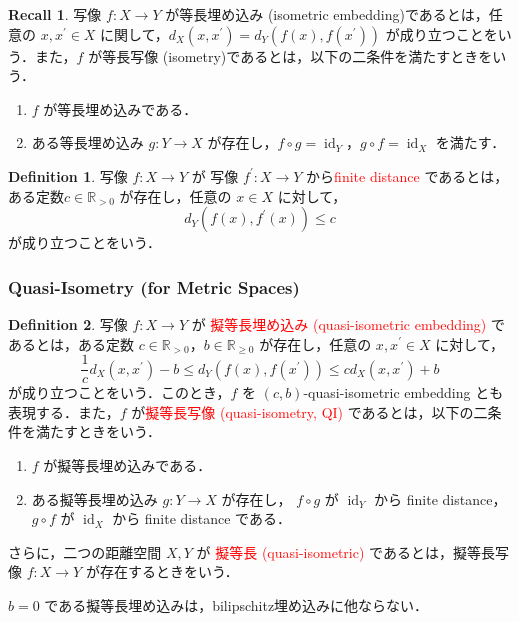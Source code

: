\documentclass[10pt]{beamer}
\DeclareMathOperator{\id}{id}
\theoremstyle{definition}
\newtheorem{dfn}{Definition}[section]
\newtheorem*{rec}{Recall}
\begin{document}
\begin{frame}
    \vspace{5mm}
    \begin{rec}
        写像 $f\colon X\rightarrow Y$ が等長埋め込み (isometric embedding)であるとは，任意の $x,x^\prime\in X$ に関して，$d_X(x,x^\prime)=d_Y(f(x),f(x^\prime))$ が成り立つことをいう．また，$f$ が等長写像 (isometry)であるとは，以下の二条件を満たすときをいう．
        \begin{enumerate}
        \item $f$ が等長埋め込みである．
        \item ある等長埋め込み $g\colon Y\rightarrow X$ が存在し，$f\circ g=\id_Y，g\circ f=\id_X$ を満たす．
        \end{enumerate}
    \end{rec}
    \begin{dfn}
        写像 $f\colon X\rightarrow Y$ が 写像 $f^\prime\colon X\rightarrow Y$ から\textcolor{red}{finite distance} であるとは，ある定数$c\in\mathbb{R}_{>0}$ が存在し，任意の $x\in X$ に対して，
        $$d_Y(f(x),f^\prime(x))\leq c$$
が成り立つことをいう．
    \end{dfn}
\end{frame}

\begin{frame}
    \frametitle{Quasi-Isometry (for Metric Spaces)}
    \begin{dfn}
        写像 $f\colon X\rightarrow Y$ が \textcolor{red}{擬等長埋め込み (quasi-isometric embedding)} であるとは，ある定数 $c\in\mathbb{R}_{>0}$，$b\in\mathbb{R}_{\geq0}$ が存在し，任意の $x,x^\prime\in X$ に対して，
        $$\frac{1}{c}d_X(x,x^\prime)-b\leq d_Y(f(x),f(x^\prime))\leq cd_X(x,x^\prime)+b$$
        が成り立つことをいう．このとき，$f$ を $(c,b)$-quasi-isometric embedding とも表現する．また，$f$ が\textcolor{red}{擬等長写像 (quasi-isometry, QI)} であるとは，以下の二条件を満たすときをいう．
        \begin{enumerate}
        \item $f$ が擬等長埋め込みである．
        \item ある擬等長埋め込み $g\colon Y\rightarrow X$ が存在し，
        $f\circ g$ が $\id_Y$ から finite distance，$g\circ f$ が $\id_X$ から finite distance である．
        \end{enumerate}
        さらに，二つの距離空間 $X,Y$ が \textcolor{red}{擬等長 (quasi-isometric)} であるとは，擬等長写像 $f\colon X\rightarrow Y$ が存在するときをいう．
    \end{dfn}
    $b=0$ である擬等長埋め込みは，bilipschitz埋め込みに他ならない．
\end{frame}
\end{document}
